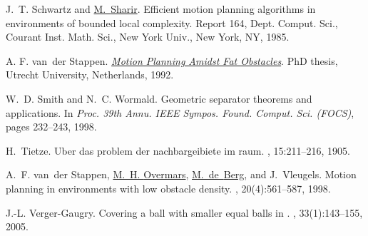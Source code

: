 \documentclass[12pt]{article}
\providecommand{\BibLatexMode}[1]{}
\renewcommand{\BibLatexMode}[1]{#1}
\theoremstyle{remark}\theoremheaderfont{\sf}\theorembodyfont{\upshape}
\numberwithin{figure}{section}\numberwithin{table}{section}\numberwithin{equation}{section}
\begin{document}
{\begin{thebibliography}{vdSOdBV98}
J.~T. Schwartz and \href{http://www.math.tau.ac.il/~michas}{M.~{Sharir}}.
\newblock  Efficient motion planning algorithms in environments of bounded
  local complexity.
\newblock Report 164, Dept. Comput. Sci., Courant Inst. Math. Sci., New York
  Univ., New York, NY, 1985.

{A. F. van~der} {Stappen}.
\newblock
  \href{http://www.staff.science.uu.nl/~stapp101/PhDThesis_AFvanderStappen.pdf}{{\em
  Motion Planning Amidst Fat Obstacles}}.
\newblock PhD thesis, Utrecht University, Netherlands, 1992.

W.~D. Smith and N.~C. Wormald.
\newblock  Geometric separator theorems and applications.
\newblock In {\em Proc. 39th Annu. IEEE Sympos. Found. Comput. Sci.
  {\em(FOCS)}}, pages 232--243, 1998.

H.~Tietze.
\newblock  Uber das problem der nachbargeibiete im raum.
, 15:211--216, 1905.

A.~F. van~der Stappen, \href{http://www.cs.uu.nl/people/markov/}{M.~H. {Overmars}}, \href{http://www.win.tue.nl/~mdberg/}{M.~de~{Berg}}, and J.~Vleugels.
\newblock  Motion planning in environments with low obstacle density.
, 20(4):561--587, 1998.

J.-L. {Verger-Gaugry}.
\newblock  Covering a ball with smaller equal balls in {}.
, 33(1):143--155, 2005.

\end{thebibliography}

}

\BibLatexMode{\printbibliography}
\end{document}
